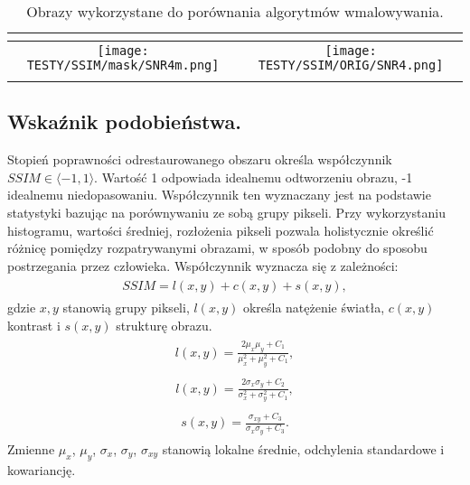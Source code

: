 \documentclass[12pt, twoside, openany]{report}
\theoremstyle{definition}
\begin{document}
\begin{longtable}[h!]{|c|c|}
    \multicolumn{2}{|c|}{
		\SNRIV
    } \\ \hline 
    \begin{minipage}{0.5\textwidth}
    \vspace{0.2cm}
    \centering
    \texttt{[image: TESTY/SSIM/mask/SNR4m.png]}
    \vspace{0.2cm}
    \end{minipage}
	&
    \begin{minipage}{0.5\textwidth}
    \vspace{0.2cm}
    \centering
    \texttt{[image: TESTY/SSIM/ORIG/SNR4.png]}
    \vspace{0.2cm}
    \end{minipage}\\ \hline
    \caption{Obrazy wykorzystane do porównania algorytmów wmalowywania.}
	\label{COMPAREIMAGES}
\end{longtable}
\subsection{Wskaźnik podobieństwa.}
Stopień poprawności odrestaurowanego obszaru określa współczynnik $SSIM \in \langle -1,1 \rangle$. Wartość 1 odpowiada idealnemu odtworzeniu obrazu, -1 idealnemu niedopasowaniu. Współczynnik ten wyznaczany jest na podstawie statystyki bazując na porównywaniu ze sobą grupy pikseli. Przy wykorzystaniu histogramu, wartości średniej, rozłożenia pikseli pozwala holistycznie określić różnicę pomiędzy rozpatrywanymi obrazami, w sposób podobny do sposobu  postrzegania przez człowieka. Współczynnik wyznacza się z zależności:
\begin{align}
\begin{aligned}
SSIM = l(x,y) + c(x,y) + s(x,y),
\end{aligned}
\end{align}
gdzie $x,y$ stanowią grupy pikseli, $l(x,y)$ określa natężenie światła, $c(x,y)$ kontrast i $s(x,y)$ strukturę obrazu.
\begin{align}
\begin{aligned}
l(x,y) = \frac{2 \mu_x \mu_y + C_1}{\mu^2_x + \mu^2_y + C_1},
\end{aligned}
\end{align}
\begin{align}
\begin{aligned}
l(x,y) = \frac{2 \sigma_x \sigma_y + C_2}{\sigma^2_x + \sigma^2_y + C_1},
\end{aligned}
\end{align}
\begin{align}
\begin{aligned}
s(x,y) = \frac{\sigma_{xy} + C_3}{\sigma_{x}\sigma_{y}+C_3}.
\end{aligned}
\end{align}
Zmienne $\mu_x$, $\mu_y$, $\sigma_{x}$, $\sigma_{y}$, $\sigma_{xy}$ stanowią lokalne średnie, odchylenia standardowe i kowariancję.
\end{document}

